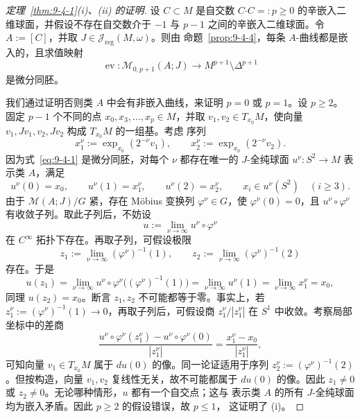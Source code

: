 \begin{proof}[定理~\ref{thm:9-4-1}(i)、(ii) 的证明]
设 $C\subset M$ 是自交数
$C\mathbin{\boldsymbol\cdot}C=:p\ge0$ 的辛嵌入二维球面，并假设不存在自交数介于
$-1$ 与 $p-1$ 之间的辛嵌入二维球面。令
$A:=[C]$，并取 $J\in\mathcal J_{\mathrm{reg}}(M,\omega)$。则由
命题~\ref{prop:9-4-4}，每条 $A$-曲线都是嵌入的，且求值映射
\[
  \operatorname{ev}:\mathcal M_{0,p+1}(A;J)
  \longrightarrow M^{p+1}\setminus\Delta^{p+1}
\]
是微分同胚。

我们通过证明否则类 $A$ 中会有非嵌入曲线，来证明 $p=0$ 或 $p=1$。设 $p\ge2$。
固定 $p-1$ 个不同的点 $x_0,x_3,\ldots,x_p\in M$，并取
$v_1,v_2\in T_{x_0}M$，使向量 $v_1,Jv_1,v_2,Jv_2$ 构成 $T_{x_0}M$ 的一组基。考虑
序列
\[
  x_1^\nu:=\exp_{x_0}(2^{-\nu}v_1),
  \qquad
  x_2^\nu:=\exp_{x_0}(2^{-\nu}v_2).
\]
因为式~\eqref{eq:9-4-1} 是微分同胚，对每个 $\nu$ 都存在唯一的 $J$-全纯球面
$u^\nu:S^2\to M$ 表示类 $A$，满足
\[
  u^\nu(0)=x_0,
  \qquad
  u^\nu(1)=x_1^\nu,
  \qquad
  u^\nu(2)=x_2^\nu,
  \qquad
  x_i\in u^\nu(S^2)\quad(i\ge3).
\]
由于 $\mathcal M(A;J)/G$ 紧，存在 Möbius 变换列 $\varphi^\nu\in G$，使
$\varphi^\nu(0)=0$，且 $u^\nu\circ\varphi^\nu$ 有收敛子列。取此子列后，不妨设
\[
  u:=\lim_{\nu\to\infty}u^\nu\circ\varphi^\nu
\]
在 $C^\infty$ 拓扑下存在。再取子列，可假设极限
\[
  z_1:=\lim_{\nu\to\infty}(\varphi^\nu)^{-1}(1),
  \qquad
  z_2:=\lim_{\nu\to\infty}(\varphi^\nu)^{-1}(2)
\]
存在。于是
\[
  u(z_1)
  =\lim_{\nu\to\infty}u^\nu\circ\varphi^\nu
       \bigl((\varphi^\nu)^{-1}(1)\bigr)
  =\lim_{\nu\to\infty}u^\nu(1)
  =\lim_{\nu\to\infty}x_1^\nu=x_0,
\]
同理 $u(z_2)=x_0$。断言 $z_1,z_2$ 不可能都等于零。事实上，若
$z_1^\nu:=(\varphi^\nu)^{-1}(1)\to0$，再取子列后，可假设商
$z_1^\nu/|z_1^\nu|$ 在 $S^1$ 中收敛。考察局部坐标中的差商
\[
  \frac{u^\nu\circ\varphi^\nu(z_1^\nu)
        -u^\nu\circ\varphi^\nu(0)}{|z_1^\nu|}
  =\frac{x_1^\nu-x_0}{|z_1^\nu|},
\]
可知向量 $v_1\in T_{x_0}M$ 属于 $du(0)$ 的像。同一论证适用于序列
$z_2^\nu:=(\varphi^\nu)^{-1}(2)$。但按构造，向量 $v_1,v_2$ 复线性无关，故不可能都属于
$du(0)$ 的像。因此 $z_1\ne0$ 或 $z_2\ne0$。无论哪种情形，$u$ 都有一个自交点；这与
表示类 $A$ 的所有 $J$-全纯球面均为嵌入矛盾。因此 $p\ge2$ 的假设错误，故 $p\le1$，
这证明了 (i)。


\end{proof}
